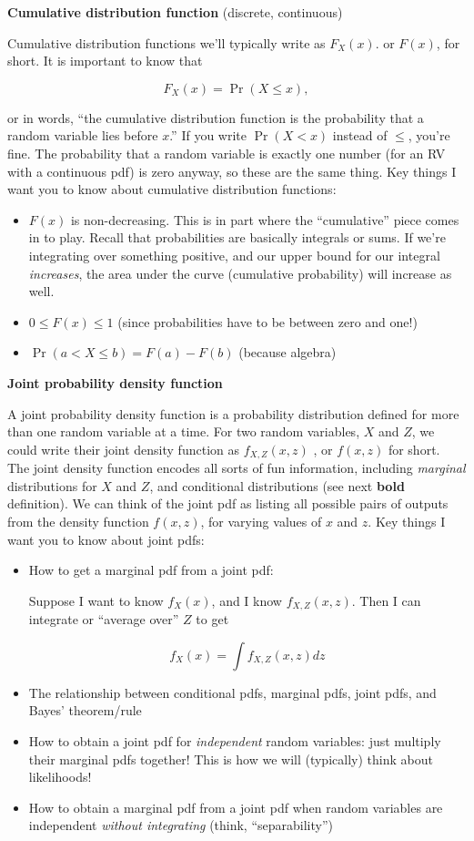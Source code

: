 \documentclass[
  letterpaper,
  DIV=11,
  numbers=noendperiod]{scrreprt}
\begin{document}
\textbf{Cumulative distribution function} (discrete, continuous)

Cumulative distribution functions we'll typically write as \(F_X(x)\).
or \(F(x)\), for short. It is important to know that

\[
F_X(x) = \Pr(X \leq x),
\]

or in words, ``the cumulative distribution function is the probability
that a random variable lies before \(x\).'' If you write \(\Pr(X < x)\)
instead of \(\leq\), you're fine. The probability that a random variable
is exactly one number (for an RV with a continuous pdf) is zero anyway,
so these are the same thing. Key things I want you to know about
cumulative distribution functions:

\begin{itemize}
\item
  \(F(x)\) is non-decreasing. This is in part where the ``cumulative''
  piece comes in to play. Recall that probabilities are basically
  integrals or sums. If we're integrating over something positive, and
  our upper bound for our integral \emph{increases}, the area under the
  curve (cumulative probability) will increase as well.
\item
  \(0 \leq F(x) \leq 1\) (since probabilities have to be between zero
  and one!)
\item
  \(\Pr(a < X \leq b) = F(a) - F(b)\) (because algebra)
\end{itemize}

\textbf{Joint probability density function}

A joint probability density function is a probability distribution
defined for more than one random variable at a time. For two random
variables, \(X\) and \(Z\), we could write their joint density function
as \(f_{X,Z}(x, z)\) , or \(f(x,z)\) for short. The joint density
function encodes all sorts of fun information, including \emph{marginal}
distributions for \(X\) and \(Z\), and conditional distributions (see
next \textbf{bold} definition). We can think of the joint pdf as listing
all possible pairs of outputs from the density function \(f(x,z)\), for
varying values of \(x\) and \(z\). Key things I want you to know about
joint pdfs:

\begin{itemize}
\item
  How to get a marginal pdf from a joint pdf:

  Suppose I want to know \(f_X(x)\), and I know \(f_{X,Z}(x,z)\). Then I
  can integrate or ``average over'' \(Z\) to get

  \[
  f_X(x) = \int f_{X,Z}(x,z)dz
  \]
\item
  The relationship between conditional pdfs, marginal pdfs, joint pdfs,
  and Bayes' theorem/rule
\item
  How to obtain a joint pdf for \emph{independent} random variables:
  just multiply their marginal pdfs together! This is how we will
  (typically) think about likelihoods!
\item
  How to obtain a marginal pdf from a joint pdf when random variables
  are independent \emph{without integrating} (think, ``separability'')
\end{itemize}
\end{document}
